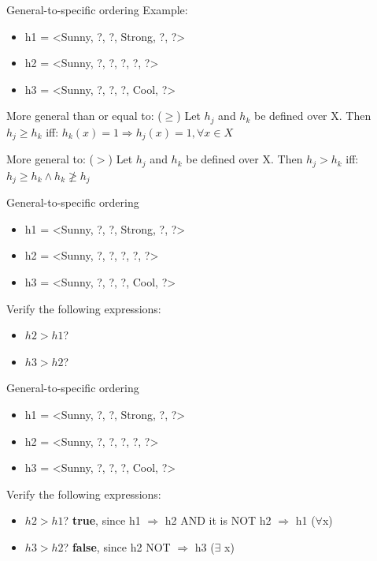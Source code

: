 \documentclass{beamer}
\begin{document}
\begin{frame}{General-to-specific ordering}
Example: 
\begin{itemize}
\item h1 = <Sunny, ?, ?, Strong, ?, ?>
\item h2 = <Sunny, ?, ?, ?, ?, ?>
\item h3 = <Sunny, ?, ?, ?, Cool, ?>
\end{itemize}

\begin{block}{More general than or equal to: ($\geq$)}
Let $h_j$ and $h_k$ be defined over X. Then $h_j \geq h_k$ iff: %
\centering $h_k(x) = 1 \Rightarrow h_j(x) = 1, \forall x \in X$
\end{block}

\begin{block}{More general to: ($>$)}
Let $h_j$ and $h_k$ be defined over X. Then $h_j > h_k$ iff:
\centering $h_j \geq h_k \land h_k \ngeq h_j$ %
\end{block}
\end{frame}

\begin{frame}{General-to-specific ordering}
\begin{itemize}
\item h1 = <Sunny, ?, ?, Strong, ?, ?>
\item h2 = <Sunny, ?, ?, ?, ?, ?>
\item h3 = <Sunny, ?, ?, ?, Cool, ?>
\end{itemize}

Verify the following expressions:
\begin{itemize}
\item $h2 > h1$? %
\item $h3 > h2$? %
\end{itemize}
\end{frame}

\begin{frame}{General-to-specific ordering}
\begin{itemize}
\item h1 = <Sunny, ?, ?, Strong, ?, ?>
\item h2 = <Sunny, ?, ?, ?, ?, ?>
\item h3 = <Sunny, ?, ?, ?, Cool, ?>
\end{itemize}

Verify the following expressions:
\begin{itemize}
\item $h2 > h1$? \textbf{true}, since h1 $\Rightarrow$ h2 AND it is NOT h2 $\Rightarrow$ h1 ($\forall $x)
\item $h3 > h2$? \textbf{false}, since h2 NOT $\Rightarrow$ h3 ($\exists$ x)
\end{itemize}
\end{frame}
\end{document}
